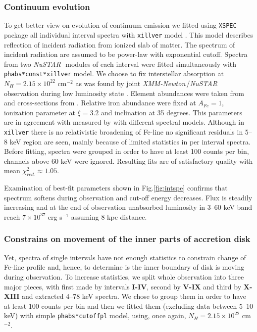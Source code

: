 \documentclass[a4paper,fleqn,usenatbib]{mnras}
\def\xmm{{\em XMM-Newton\,}}
\def\nustar{{\em NuSTAR\,}}
\begin{document}
\subsubsection{Continuum evolution}
To get better view on evolution of continuum emission we fitted using \texttt{XSPEC} package \citep{arnaud96} all individual interval spectra with \texttt{xillver} model \citep{garcia13}. This model describes reflection of incident radiation from ionized slab of matter. The spectrum of incident radiation are assumed to be power-law with exponential cutoff. Spectra from two \nustar\, modules of each interval were fitted simultaneously with \texttt{phabs*const*xillver} model. We choose to fix interstellar absorption at $N_{H} = 2.15\times10^{22}$ cm$^{-2}$  as was found by joint \xmm/\nustar\, observation during low luminosity state \citep{fuerst16}. Element abundances were taken from \cite{wilms00} and cross-sections from \cite{verner96}. Relative iron abundance were fixed at
 $A_{Fe} = 1$, ionization parameter at $\xi=3.2$ and inclination at 35 degrees. This parameters are in agreement with measured by \cite{miller15_nust} with different spectral models. Although in  \texttt{xillver} there is no relativistic broadening of Fe-line no significant residuals in 5--8 keV region are seen, mainly because of limited statistics in per interval spectra. Before fitting, spectra were grouped in order to have at least 100 counts per bin, channels above 60 keV were ignored. Resulting fits are of satisfactory quality with mean $\chi^{2}_{red.} \approx 1.05$. 
 
Examination of best-fit parameters shown in Fig.\ref{fig:intspe} confirms that spectrum softens during observation and cut-off energy decreases. Flux is steadily increasing and at the end of observation unabsorbed luminosity in 3--60 keV band reach  $7\times10^{37}$ erg s$^{-1}$ assuming 8 kpc distance. 

\subsubsection{Constrains on movement of the inner parts of accretion disk}
Yet, spectra of single intervals have not enough statistics to constrain change of Fe-line profile and, hence, to determine is the inner boundary of disk is moving during observation. To increase statistics, we split whole observation into three major pieces, with first made by intervals {\bf I-IV}, second by {\bf V-IX} and third by {\bf X-XIII} and extracted 4--78 keV spectra. 
We chose to group them in order to have at least 100 counts per bin and then we fitted them (excluding data between 5--10 keV) with simple \texttt{phabs*cutoffpl} model, using, once again, $N_{H} = 2.15\times10^{22}$ cm$^{-2}$.  
\end{document}
